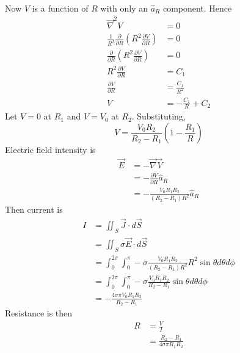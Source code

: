 \documentclass[answers]{exam}
\begin{document}
\begin{questions}

\begin{solution}
	Now $V$ is a function of $R$ with only an $\hat a_R$ component. Hence
	\begin{align*}
		\vec \nabla^2 V &= 0 \\
		\frac{1}{R^2} \frac{\partial}{\partial R}\left(R^2\frac{\partial V}{\partial R}\right) &= 0 \\
		\frac{\partial}{\partial R}\left(R^2\frac{\partial V}{\partial R}\right) &= 0 \\
		R^2\frac{\partial V}{\partial R} &= C_1 \\
		\frac{\partial V}{\partial R} &= \frac{C_1}{R^2} \\
		V &= -\frac{C_1}{R} + C_2
	\end{align*}
	Let $V=0$ at $R_1$ and $V=V_0$ at $R_2$. Substituting,
	$$V = \frac{V_0R_2}{R_2-R_1}\left(1-\frac{R_1}{R}\right)$$
	Electric field intensity is
	\begin{align*}
		\vec E &= -\vec \nabla \vec V \\
		       &= -\frac{\partial V}{\partial R} \hat a_R \\
		       &= -\frac{V_0R_1R_2}{(R_2-R_1)R^2} \hat a_R
	\end{align*}
	Then current is
	\begin{align*}
		I &= \iint_S \vec J \cdot d\vec S \\
		  &= \iint_S \sigma \vec E \cdot d\vec S \\
		  &= \int_0^{2\pi} \int_0^\pi -\sigma \frac{V_0R_1R_2}{(R_2-R_1)R^2} R^2\sin\theta d\theta d\phi \\
		  &= \int_0^{2\pi} \int_0^\pi -\sigma \frac{V_0R_1R_2}{R_2-R_1} \sin\theta d\theta d\phi \\
		  &= -\frac{4\sigma\pi V_0R_1R_2}{R_2-R_1}
	\end{align*}
	Resistance is then
	\begin{align*}
		R &= \frac{V}{I} \\
		  &= \frac{R_2-R_1}{4\sigma\pi R_1R_2}
	\end{align*}
\end{solution}



\end{questions}
\end{document}
